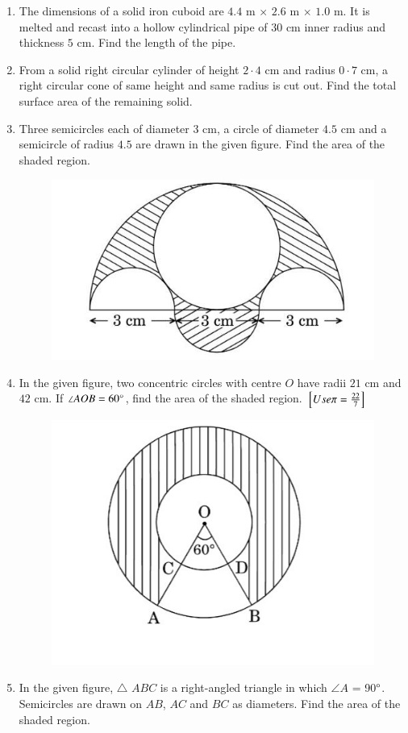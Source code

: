 \begin{enumerate}
\item The dimensions of a solid iron cuboid are $4.4$ m $\times$ $2.6$ m $\times$ $1.0$ m. It is melted and recast into a hollow cylindrical pipe of $30$ cm inner radius and thickness $5$ cm. Find the length of the pipe. 
\item From a solid right circular cylinder of height $2·4$ cm and radius $0·7$ cm, a right circular cone of same height and same radius is cut out. Find the total surface area of the remaining solid.
\item Three semicircles each of diameter $3$ cm, a circle of diameter $4.5$ cm and a semicircle of radius $4.5$ are drawn in the given figure. Find the area of the shaded region.
\begin{figure}[H]
\centering
\includegraphics[width = 0.6\columnwidth]{figs/geo1.jpg}  
\end{figure}
\item In the given figure, two concentric circles with centre $O$ have radii $21$ cm and $42$ cm. If $\angle AOB = 60\degree$, find the area of the shaded region.
\hfill ${}\left[Use \pi = \frac{22}{7}\right]$
\begin{figure}[H]
\centering
\includegraphics[width=0.6\columnwidth]{figs/geo2.jpg}
 \end{figure}
\item In the given figure, $\triangle$ $ABC$ is a right-angled triangle in which $\angle{A}$ = 90$\degree$. Semicircles are drawn on $AB$, $AC$ and $BC$ as diameters. Find the area of the shaded region.

\end{enumerate}
